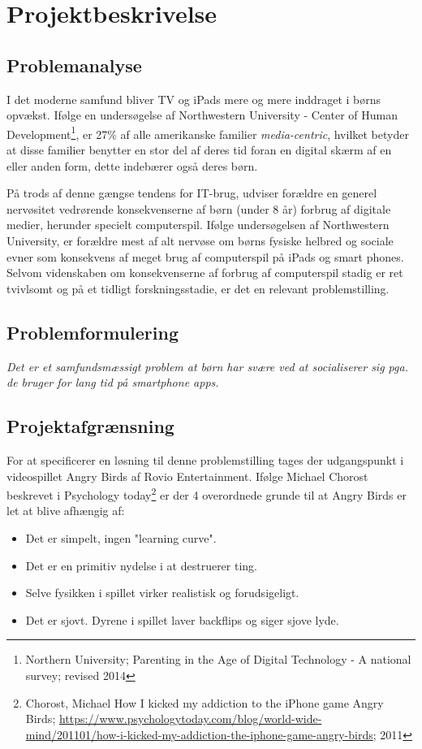 \section{Projektbeskrivelse}
 
\subsection{Problemanalyse}
% 
% 
% 
I det moderne samfund bliver TV og iPads mere og mere inddraget i børns opvækst. Ifølge en undersøgelse af Northwestern University - Center of Human Development\footnote{Northern University; Parenting in the Age of Digital Technology - A national survey; revised 2014}, er 27\% af alle amerikanske familier
 \emph{media-centric}, hvilket betyder at disse familier benytter en stor del af deres tid foran en digital skærm af en eller anden form, dette indebærer også deres børn. 

På trods af denne gængse tendens for IT-brug, udviser forældre en generel nervøsitet vedrørende konsekvenserne af børn (under 8 år) forbrug af digitale medier, herunder specielt computerspil. Ifølge undersøgelsen af Northwestern University, er forældre mest af alt nervøse om børns fysiske helbred og sociale evner som konsekvens af meget brug af computerspil på iPads og smart phones.
Selvom videnskaben om konsekvenserne af forbrug af computerspil stadig er ret tvivlsomt og på et tidligt forskningsstadie, er det en relevant problemstilling.

\subsection{Problemformulering}
\emph{Det er et samfundsmæssigt problem at børn har svære ved at socialiserer sig pga. de bruger for lang tid på smartphone apps.}


\subsection{Projektafgrænsning}
For at specificerer en løsning til denne problemstilling tages der udgangspunkt i videospillet Angry Birds af Rovio Entertainment. Ifølge Michael Chorost beskrevet i Psychology today\footnote{Chorost, Michael How I kicked my addiction to the iPhone game Angry Birds; \url{https://www.psychologytoday.com/blog/world-wide-mind/201101/how-i-kicked-my-addiction-the-iphone-game-angry-birds}; 2011}
er der 4 overordnede grunde til at Angry Birds er let at blive afhængig af:
\begin{itemize}
	\item Det er simpelt, ingen "learning curve".
	\item Det er en primitiv nydelse i at destruerer ting.
	\item Selve fysikken i spillet virker realistisk og forudsigeligt.
	\item Det er sjovt. Dyrene i spillet laver backflips og siger sjove lyde.
\end{itemize}

